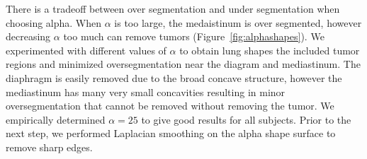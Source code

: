 \documentclass{llncs}
\begin{document}
There is a tradeoff between over segmentation and under segmentation when choosing alpha. When $\alpha$ is too large, the medaistinum is over segmented, however decreasing $\alpha$ too much can remove tumors (Figure~\ref{fig:alphashapes}).  We experimented with different values of $\alpha$ to obtain lung shapes the included tumor regions and minimized oversegmentation near the diagram and mediastinum. The diaphragm is easily removed due to the broad concave structure, however the mediastinum has many very small concavities resulting in minor oversegmentation that cannot be removed without removing the tumor. We empirically determined $ \alpha=25 $ to give good results for all subjects. Prior to the next step, we performed Laplacian smoothing on the alpha shape surface to remove sharp edges. 
\end{document}
